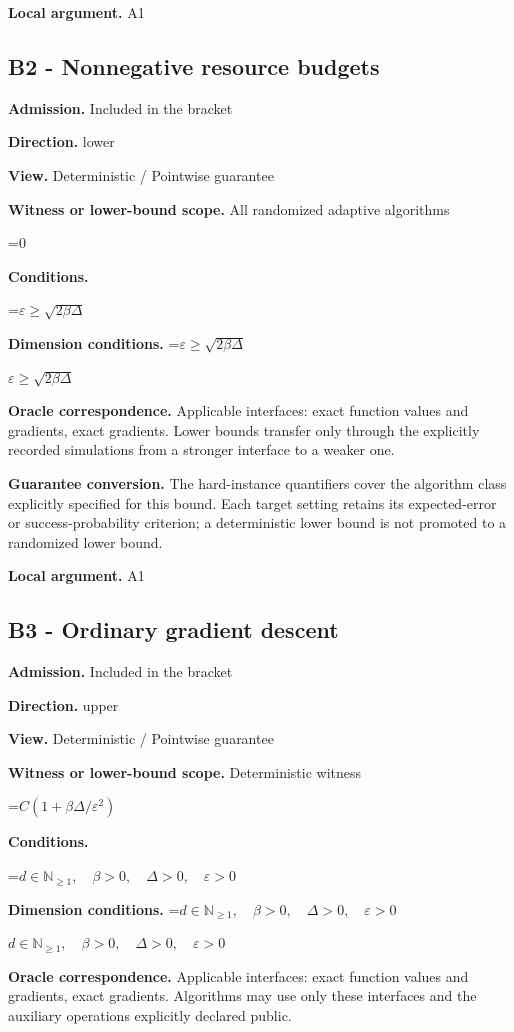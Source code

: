\documentclass[10pt,a4paper]{article}
\newcommand{\AtlasMath}[1]{\par\begingroup\centering\setbox0=\hbox{$\displaystyle #1$}\ifdim\wd0>1.4\linewidth\typeout{ATLAS WIDE FORMULA: \the\wd0}\fi\ifdim\wd0>\linewidth\resizebox{\linewidth}{!}{\box0}\else\box0\fi\par\endgroup}
\newcommand{\AtlasInlineMath}[1]{\begingroup\setbox0=\hbox{$#1$}\ifdim\wd0>.4\linewidth\endgroup\AtlasMath{#1}\else\endgroup$#1$\fi}
\begin{document}
\textbf{Local argument.} A1

\subsection{B2 - Nonnegative resource budgets}
\textbf{Admission.} Included in the bracket

\textbf{Direction.} lower

\textbf{View.} Deterministic / Pointwise guarantee

\textbf{Witness or lower-bound scope.} All randomized adaptive algorithms

\AtlasMath{0}
\textbf{Conditions.} 
\AtlasMath{\varepsilon\ge\sqrt{2\beta\Delta}}


\textbf{Dimension conditions.} \AtlasInlineMath{\varepsilon\ge\sqrt{2\beta\Delta}}

\textbf{Oracle correspondence.} Applicable interfaces: exact function values and gradients, exact gradients. Lower bounds transfer only through the explicitly recorded simulations from a stronger interface to a weaker one.

\textbf{Guarantee conversion.} The hard-instance quantifiers cover the algorithm class explicitly specified for this bound. Each target setting retains its expected-error or success-probability criterion; a deterministic lower bound is not promoted to a randomized lower bound.

\textbf{Local argument.} A1

\subsection{B3 - Ordinary gradient descent}
\textbf{Admission.} Included in the bracket

\textbf{Direction.} upper

\textbf{View.} Deterministic / Pointwise guarantee

\textbf{Witness or lower-bound scope.} Deterministic witness

\AtlasMath{C(1+\beta\Delta/\varepsilon^2)}
\textbf{Conditions.} 
\AtlasMath{d\in\mathbb{N}_{\ge1},\quad \beta>0,\quad \Delta>0,\quad \varepsilon>0}


\textbf{Dimension conditions.} \AtlasInlineMath{d\in\mathbb{N}_{\ge1},\quad \beta>0,\quad \Delta>0,\quad \varepsilon>0}

\textbf{Oracle correspondence.} Applicable interfaces: exact function values and gradients, exact gradients. Algorithms may use only these interfaces and the auxiliary operations explicitly declared public.
\end{document}
